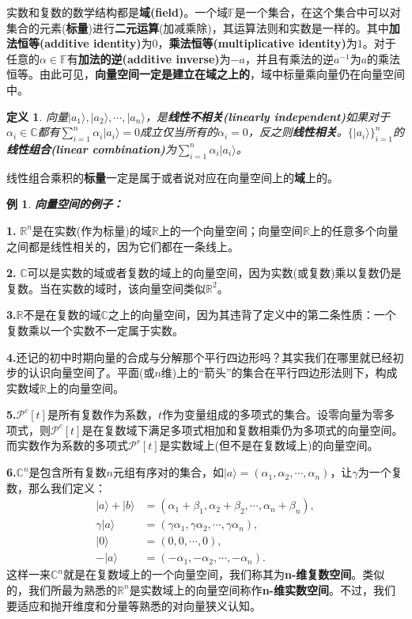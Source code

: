 \documentclass[mathserif,hyperref,UTF8,openany,b5paper]{ctexbook}
\newtheorem{exmp}{例}[section]
\newtheorem{defn}{定义}[section]
\begin{document}
实数和复数的数学结构都是\textbf{域(field)}。一个域$\mathbb{F}$是一个集合，在这个集合中可以对集合的元素(\textbf{标量})进行\textbf{二元运算}(加减乘除)，其运算法则和实数是一样的。其中\textbf{加法恒等(additive identity)}为$0$，\textbf{乘法恒等(multiplicative identity)}为$1$。对于任意的$\alpha \in \mathbb{F}$有\textbf{加法的逆(additive inverse)}为$-a$，并且有乘法的逆$a^{-1}$为$a$的乘法恒等。由此可见，\textbf{向量空间一定是建立在域之上的}，域中标量乘向量仍在向量空间中。
\begin{defn}
向量$|a_1\rangle,|a_2\rangle,\cdots,|a_n\rangle$，是\textbf{线性不相关(linearly independent)}如果对于$\alpha_i\in \mathbb{C}$都有$\sum^n_{i=1}\alpha_i|a_i\rangle = 0$成立仅当所有的$\alpha_i = 0$，反之则\textbf{线性相关}。$\{|a_i\rangle\}^n_{i=1}$的\textbf{线性组合(linear combination)}为$\sum^n_{i=1}\alpha_i|a_i\rangle $。
\end{defn}
线性组合乘积的\textbf{标量}一定是属于或者说对应在向量空间上的\textbf{域}上的。
\begin{exmp} \textbf{向量空间的例子：}\end{exmp}
\textbf{1.} $\mathbb{R}^n$是在实数(作为标量)的域$\mathbb{R}$上的一个向量空间；向量空间$\mathbb{R}$上的任意多个向量之间都是线性相关的，因为它们都在一条线上。

\textbf{2.} $\mathbb{C}$可以是实数的域或者复数的域上的向量空间，因为实数(或复数)乘以复数仍是复数。当在实数的域时，该向量空间类似$\mathbb{R}^2$。

\textbf{3.}$\mathbb{R}$不是在复数的域$\mathbb{C}$之上的向量空间，因为其违背了定义中的第二条性质：一个复数乘以一个实数不一定属于实数。

\textbf{4.}还记的初中时期向量的合成与分解那个平行四边形吗？其实我们在哪里就已经初步的认识向量空间了。平面(或$n$维)上的“箭头”的集合在平行四边形法则下，构成实数域$\mathbb{R}$上的向量空间。

\textbf{5.}$\mathcal{P}^c [t]$是所有复数作为系数，$t$作为变量组成的多项式的集合。设零向量为零多项式，则$\mathcal{P}^c [t]$是在复数域下满足多项式相加和复数相乘仍为多项式的向量空间。而实数作为系数的多项式$\mathcal{P}^r [t]$是实数域上(但不是在复数域上)的向量空间。

\textbf{6.}$\mathbb{C}^n$是包含所有复数$n$元组有序对的集合，如$|a\rangle=(\alpha_1,\alpha_2,\cdots,\alpha_n)$，让$\gamma$为一个复数，那么我们定义：
\begin{align}
|a\rangle +|b\rangle &= (\alpha_1+\beta_1,\alpha_2+\beta_2,\cdots,\alpha_n+\beta_n),\\
\gamma|a\rangle &= (\gamma\alpha_1,\gamma\alpha_2,\cdots,\gamma\alpha_n),\\
|0\rangle &=(0,0,\cdots,0),\\
-|a\rangle&=(-\alpha_1,-\alpha_2,\cdots,-\alpha_n).
\end{align}
这样一来$\mathbb{C}^n$就是在复数域上的一个向量空间，我们称其为\textbf{n-维复数空间}。类似的，我们所最为熟悉的$\mathbb{R}^n$是实数域上的向量空间称作\textbf{n-维实数空间}。不过，我们要适应和抛开维度和分量等熟悉的对向量狭义认知。
\end{document}
